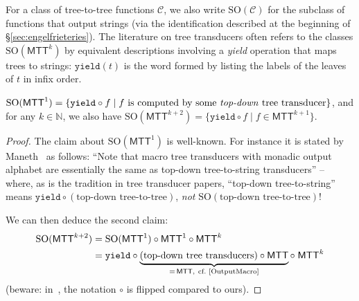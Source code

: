 \documentclass{fundam}
\newcommand{\bbN}{\mathbb{N}}
\newcommand{\cC}{\mathcal{C}}
\newcommand{\MTT}{\mathsf{MTT}}
\newcommand{\SO}{\mathrm{SO}}
\newcommand{\yield}{{\mathtt{yield}}}
\theoremstyle{claimstyle}
\begin{document}
For a class of tree-to-tree functions $\cC$, we also write $\SO(\cC)$ for the subclass of functions that output strings (via the identification described at the beginning of \S\ref{sec:engelfrieteries}). The literature on tree transducers often refers to the classes $\SO(\MTT^k)$ by equivalent descriptions involving a \emph{yield} operation that maps trees to strings:
$\yield(t)$ is the word formed by listing the labels of the leaves of $t$ in infix order.
\begin{claim}\label{clm:clarification-mtt}
  $\SO(\MTT^1) = \{\yield\circ f \mid f\ \text{is computed by some \emph{top-down} tree transducer}\}$, and for any $k\in\bbN$, we also have
  $\SO(\MTT^{k+2}) = \{\yield\circ f \mid f \in \MTT^{k+1}\}$.
\end{claim}
\begin{proof}
  The claim about $\SO(\MTT^1)$ is well-known. For instance it is stated by Maneth~\cite[end of~\S5]{Maneth15} as follows:
  \enquote{Note that macro tree transducers with monadic output alphabet are essentially the same as top-down tree-to-string transducers} -- where, as is the tradition in tree transducer papers, \enquote{top-down tree-to-string} means $\yield\circ(\text{top-down tree-to-tree})$, \emph{not} $\SO(\text{top-down tree-to-tree})$!

  We can then deduce the second claim:
  \begin{align*}
    \SO(\MTT^{k+2}) &= \SO(\MTT^1)\circ\MTT^1\circ\MTT^{k}\\
    &= \yield \circ \underbrace{(\text{top-down tree transducers}) \circ \MTT}_{=\,\MTT,\ \text{cf.~\cite[Lemma~5]{OutputMacro}}} \circ\; \MTT^{k}
  \end{align*}
  (beware: in~\cite{OutputMacro}, the notation $\circ$ is flipped compared to ours).
\end{proof}
\end{document}
